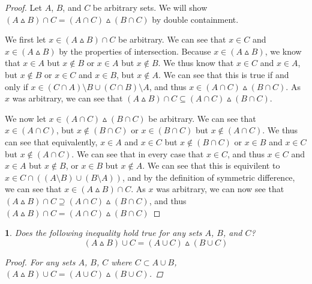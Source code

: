 \documentclass{book}
\newtheorem{minorEx}{}[section]
\begin{document}
    \begin{proof}
    Let $A$, $B$, and $C$ be arbitrary sets. We will show $(A \vartriangle B) \cap C = (A \cap C) \vartriangle (B \cap C)$ by double containment.
    
    We first let $x \in (A \vartriangle B) \cap C$ be arbitrary. We can see that $x\in C$ and $x\in (A \vartriangle B)$ by the properties of intersection. Because $x\in (A \vartriangle B)$, we know that $x \in A$ but $x \notin B$ or $x \in A$ but $x \notin B$. We thus know that $x\in C$ and $x\in A$, but $x\notin B$ or $x\in C$ and $x\in B$, but $x \notin A$. We can see that this is true if and only if $x \in (C \cap A) \setminus B \cup (C \cap B)\setminus A$, and thus $x \in (A \cap C) \vartriangle (B \cap C)$. As $x$ was arbitrary, we can see that $(A \vartriangle B) \cap C \subseteq (A \cap C) \vartriangle (B \cap C)$.
    
    We now let $x \in (A \cap C) \vartriangle (B \cap C)$ be arbitrary. We can see that $x \in (A \cap C)$, but $x\notin (B \cap C)$ or $x\in (B \cap C)$ but $x\notin (A \cap C)$. We thus can see that equivalently, $x \in A$ and $x\in C$ but $x\notin (B \cap C)$ or $x \in B$ and $x\in C$ but $x\notin (A \cap C)$. We can see that in every case that $x \in C$, and thus $x\in C$ and $x \in A$ but $x\notin B$, or $x \in B$ but $x\notin A$. We can see that this is equivilent to $x \in C \cap ((A\setminus B) \cup (B \setminus A ))$, and by the definition of symmetric difference, we can see that $x \in (A \vartriangle B) \cap C$. As $x$ was arbitrary, we can now see that $(A \vartriangle B) \cap C \supseteq (A \cap C) \vartriangle (B \cap C)$, and thus $(A \vartriangle B) \cap C = (A \cap C) \vartriangle (B \cap C)$
    \end{proof}
    \begin{minorEx}%
    Does the following inequality hold true for any sets $A$, $B$, and $C$? $$(A \vartriangle B) \cup C = (A \cup C) \vartriangle (B \cup C)$$
    \begin{proof}
    For any sets $A$, $B$, $C$ where $C \subset A \cup B$, $(A \vartriangle B) \cup C = (A \cup C) \vartriangle (B \cup C)$.
    \end{proof}
    \end{minorEx}
            
\end{document}
